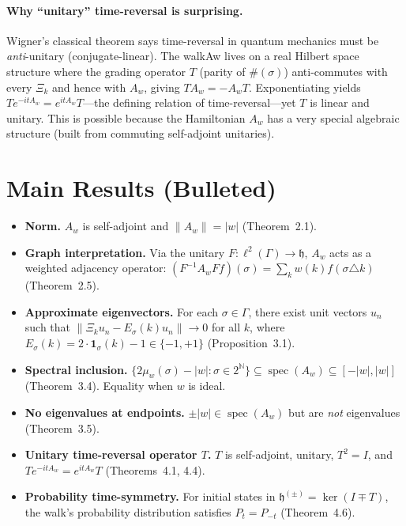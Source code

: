 \documentclass[11pt,a4paper]{article}
\begin{document}
\paragraph{Why ``unitary'' time-reversal is surprising.}
Wigner's classical theorem says time-reversal in quantum mechanics must be \emph{anti}-unitary (conjugate-linear). The walkAw lives on a real Hilbert space structure where the grading operator $T$ (parity of $\#(\sigma)$) anti-commutes with every $\Xi_k$ and hence with $A_w$, giving $TA_w=-A_wT$. Exponentiating yields $Te^{-itA_w}=e^{itA_w}T$—the defining relation of time-reversal—yet $T$ is linear and unitary. This is possible because the Hamiltonian $A_w$ has a very special algebraic structure (built from commuting self-adjoint unitaries).

\section{Main Results (Bulleted)}

\begin{itemize}
\item \textbf{Norm.} $A_w$ is self-adjoint and $\|A_w\|=|w|$ (Theorem~2.1).
\item \textbf{Graph interpretation.} Via the unitary $F\colon\ell^2(\Gamma)\to\mathfrak{h}$, $A_w$ acts as a weighted adjacency operator: $(F^{-1}A_wFf)(\sigma)=\sum_k w(k)f(\sigma\triangle k)$ (Theorem~2.5).
\item \textbf{Approximate eigenvectors.} For each $\sigma\in\Gamma$, there exist unit vectors $u_n$ such that $\|\Xi_k u_n - E_\sigma(k)u_n\|\to 0$ for all $k$, where $E_\sigma(k)=2\cdot\mathbf{1}_\sigma(k)-1\in\{-1,+1\}$ (Proposition~3.1).
\item \textbf{Spectral inclusion.} $\{2\mu_w(\sigma)-|w|:\sigma\in 2^{\mathbb{N}}\}\subseteq\operatorname{spec}(A_w)\subseteq[-|w|,|w|]$ (Theorem~3.4). Equality when $w$ is ideal.
\item \textbf{No eigenvalues at endpoints.} $\pm|w|\in\operatorname{spec}(A_w)$ but are \emph{not} eigenvalues (Theorem~3.5).
\item \textbf{Unitary time-reversal operator $T$.} $T$ is self-adjoint, unitary, $T^2=I$, and $Te^{-itA_w}=e^{itA_w}T$ (Theorems~4.1, 4.4).
\item \textbf{Probability time-symmetry.} For initial states in $\mathfrak{h}^{(\pm)}=\ker(I\mp T)$, the walk's probability distribution satisfies $P_t=P_{-t}$ (Theorem~4.6).
\end{itemize}
\end{document}
